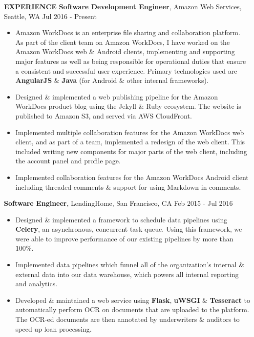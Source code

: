\documentclass[10pt, letterpaper]{article}
\begin{document}
\textbf{EXPERIENCE}
\smallskip
\newline
\textbf{Software Development Engineer}, Amazon Web Services, Seattle, WA \hfill Jul 2016 - Present
\begin{itemize}
    \item Amazon WorkDocs is an enterprise file sharing and collaboration platform. As part of the client team on Amazon WorkDocs, I have worked on
  the Amazon WorkDocs web \& Android clients, implementing and supporting major features as well as being responsible for operational duties that ensure
  a consistent and successful user experience. Primary technologies used are \textbf{AngularJS} \& \textbf{Java} (for Android \& other internal frameworks). 
    \item Designed \& implemented a web publishing pipeline for the Amazon WorkDocs product blog using the Jekyll \& Ruby ecosystem. The website is
  published to Amazon S3, and served via AWS CloudFront.
    \item Implemented multiple collaboration features for the Amazon WorkDocs web client, and as part of a team, implemented a redesign of
  the web client. This included writing new components for major parts of the web client, including the account panel and profile page.
    \item Implemented collaboration features for the Amazon WorkDocs Android client including threaded comments \& support for using Markdown in comments.
\end{itemize}
\textbf{Software Engineer}, LendingHome, San Francisco, CA \hfill Feb 2015 - Jul 2016
\begin{itemize}
    \item Designed \& implemented a framework to schedule data pipelines using \textbf{Celery}, an asynchronous, concurrent task queue.
  Using this framework, we were able to improve performance of our existing pipelines by more than 100\%.
    \item Implemented data pipelines which funnel all of the organization's internal \& external data into our data warehouse,
  which powers all internal reporting and analytics.
    \item Developed \& maintained a web service using \textbf{Flask}, \textbf{uWSGI} \& \textbf{Tesseract} to automatically perform OCR on documents
  that are uploaded to the platform. The OCR-ed documents are then annotated by underwriters \& auditors to speed up loan processing.
\end{itemize}
\end{document}

